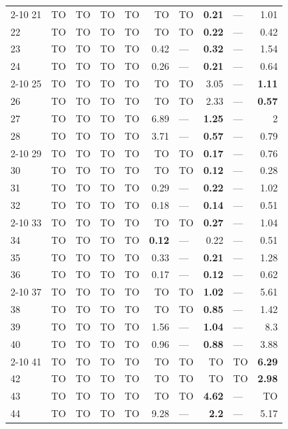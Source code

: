 \begin{longtable}{lr@{\hskip 4pt}l@{\hskip 12pt}r@{\hskip 4pt}l@{\hskip 12pt}r@{\hskip 4pt}l@{\hskip 12pt}r@{\hskip 4pt}l@{\hskip 12pt}r}
\cmidrule{2-10}
21 & TO & TO & TO & TO & TO & TO & \textbf{0.21} & --- & 1.01 \\
22 & TO & TO & TO & TO & TO & TO & \textbf{0.22} & --- & 0.42 \\
23 & TO & TO & TO & TO & 0.42 & --- & \textbf{0.32} & --- & 1.54 \\
24 & TO & TO & TO & TO & 0.26 & --- & \textbf{0.21} & --- & 0.64 \\
\cmidrule{2-10}
25 & TO & TO & TO & TO & TO & TO & 3.05 & --- & \textbf{1.11} \\
26 & TO & TO & TO & TO & TO & TO & 2.33 & --- & \textbf{0.57} \\
27 & TO & TO & TO & TO & 6.89 & --- & \textbf{1.25} & --- & 2 \\
28 & TO & TO & TO & TO & 3.71 & --- & \textbf{0.57} & --- & 0.79 \\
\cmidrule{2-10}
29 & TO & TO & TO & TO & TO & TO & \textbf{0.17} & --- & 0.76 \\
30 & TO & TO & TO & TO & TO & TO & \textbf{0.12} & --- & 0.28 \\
31 & TO & TO & TO & TO & 0.29 & --- & \textbf{0.22} & --- & 1.02 \\
32 & TO & TO & TO & TO & 0.18 & --- & \textbf{0.14} & --- & 0.51 \\
\cmidrule{2-10}
33 & TO & TO & TO & TO & TO & TO & \textbf{0.27} & --- & 1.04 \\
34 & TO & TO & TO & TO & \textbf{0.12} & --- & 0.22 & --- & 0.51 \\
35 & TO & TO & TO & TO & 0.33 & --- & \textbf{0.21} & --- & 1.28 \\
36 & TO & TO & TO & TO & 0.17 & --- & \textbf{0.12} & --- & 0.62 \\
\cmidrule{2-10}
37 & TO & TO & TO & TO & TO & TO & \textbf{1.02} & --- & 5.61 \\
38 & TO & TO & TO & TO & TO & TO & \textbf{0.85} & --- & 1.42 \\
39 & TO & TO & TO & TO & 1.56 & --- & \textbf{1.04} & --- & 8.3 \\
40 & TO & TO & TO & TO & 0.96 & --- & \textbf{0.88} & --- & 3.88 \\
\cmidrule{2-10}
41 & TO & TO & TO & TO & TO & TO & TO & TO & \textbf{6.29} \\
42 & TO & TO & TO & TO & TO & TO & TO & TO & \textbf{2.98} \\
43 & TO & TO & TO & TO & TO & TO & \textbf{4.62} & --- & TO \\
44 & TO & TO & TO & TO & 9.28 & --- & \textbf{2.2} & --- & 5.17 \\

\end{longtable}
